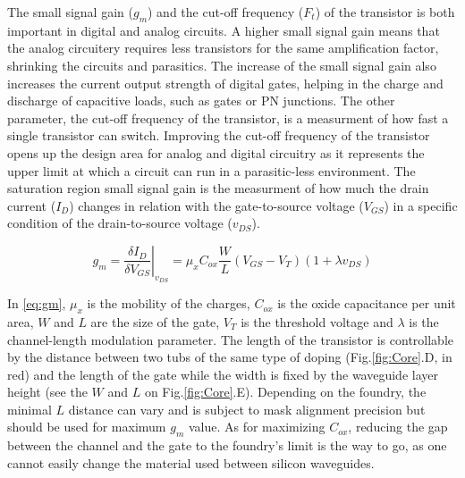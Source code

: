 
The small signal gain ($g_m$) and the cut-off frequency ($F_t$) of the transistor is both important in digital and analog circuits. 
A higher small signal gain means that the analog circuitery requires less transistors for the same amplification factor, shrinking the circuits and parasitics. 
The increase of the small signal gain also increases the current output strength of digital gates, helping in the charge and discharge of capacitive loads, such as gates or PN junctions. 
The other parameter, the cut-off frequency of the transistor, is a measurment of how fast a single transistor can switch.
Improving the cut-off frequency of the transistor opens up the design area for analog and digital circuitry as it represents the upper limit at which a circuit can run in a parasitic-less environment. 
The saturation region small signal gain is the measurment of how much the drain current ($I_D$) changes in relation with the gate-to-source voltage ($V_{GS}$) in a specific condition of the drain-to-source voltage ($v_{DS}$).

\begin{equation}
\label{eq:gm}
g_m = \left.\frac{\delta I_D}{\delta V_{GS}}\right|_{v_{DS}} = \mu_x C_{ox}\frac{W}{L}(V_{GS}-V_T)(1+\lambda v_{DS})
\end{equation}

In \ref{eq:gm}, $\mu_x$ is the mobility of the charges, $C_{ox}$ is the oxide capacitance per unit area, $W$ and $L$ are the size of the gate, $V_T$ is the threshold voltage and $\lambda$ is the channel-length modulation parameter. 
The length of the transistor is controllable by the distance between two tubs of the same type of doping (Fig.\ref{fig:Core}.D, in red) and the length of the gate while the width is fixed by the waveguide layer height (see the $W$ and $L$ on Fig.\ref{fig:Core}.E).
Depending on the foundry, the minimal $L$ distance can vary and is subject to mask alignment precision but should be used for maximum $g_m$ value. 
As for maximizing $C_{ox}$, reducing the gap between the channel and the gate to the foundry's limit is the way to go, as one cannot easily change the material used between silicon waveguides. 

